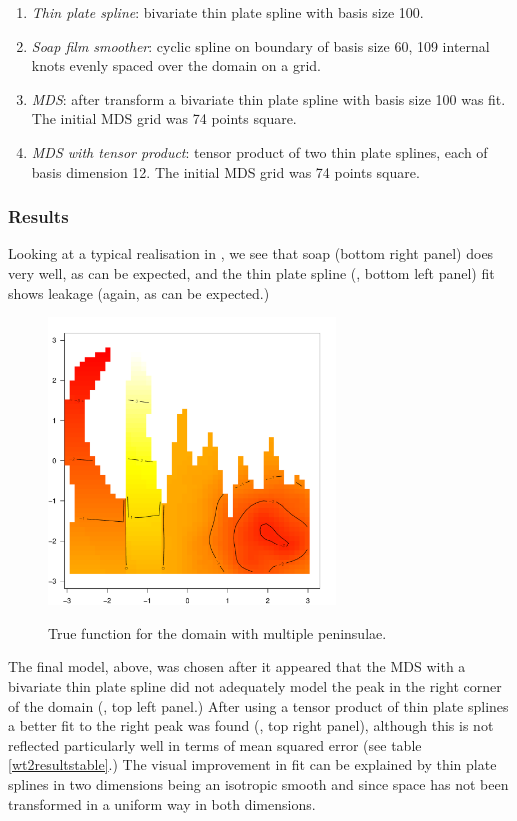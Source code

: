 \begin{enumerate}
\item \emph{Thin plate spline}: bivariate thin plate spline with basis size 100. 
\item \emph{Soap film smoother}: cyclic spline on boundary of basis size 60, 109 internal knots evenly spaced over the domain on a grid.
\item \emph{MDS}: after transform a bivariate thin plate spline with basis size 100 was fit. The initial MDS grid was 74 points square.
\item \emph{MDS with tensor product}: tensor product of two thin plate splines, each of basis dimension 12. The initial MDS grid was 74 points square.
\end{enumerate} 

\subsubsection{Results}

Looking at a typical realisation in , we see that soap (bottom right panel) does very well, as can be expected, and the thin plate spline (, bottom left panel) fit shows leakage (again, as can be expected.) 

\begin{figure}
\centering
\includegraphics[width=3in]{mds/figs/wt2-truth.pdf} \\
\caption{True function for the domain with multiple peninsulae.}
\label{wt2-truth}
\end{figure}

The final model, above, was chosen after it appeared that the MDS with a bivariate thin plate spline did not adequately model the peak in the right corner of the domain (, top left panel.) After using a tensor product of thin plate splines a better fit to the right peak was found (, top right panel), although this is not reflected particularly well in terms of mean squared error (see table \ref{wt2resultstable}.) The visual improvement in fit can be explained by thin plate splines in two dimensions being an isotropic smooth and since space has not been transformed in a uniform way in both dimensions.

